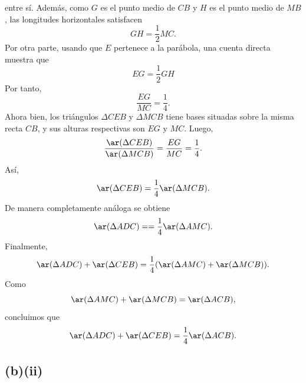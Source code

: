 \documentclass[12pt,a4paper]{article}
\begin{document}
\begin{solucion}
        entre sí. Además, como $G$ es el punto medio de $CB$ y $H$ es el punto medio de $MB$,
        las longitudes horizontales satisfacen
        \begin{equation*}
            GH=\frac{1}{2}MC.
        \end{equation*}
        Por otra parte, usando que $E$ pertenece a la parábola, una cuenta directa muestra que
        \begin{equation*}
            EG=\frac{1}{2}GH
        \end{equation*}
        Por tanto,
        \begin{equation*}
            \frac{EG}{MC}=\frac{1}{4}.
        \end{equation*}
        Ahora bien, los triángulos $\Delta CEB$ y $\Delta MCB$ tiene bases situadas sobre la misma
        recta $CB$, y sus alturas respectivas son $EG$ y $MC$. Luego,
        \begin{equation*}
            \frac{\ar(\Delta CEB)}{\ar(\Delta MCB)}=\frac{EG}{MC}=\frac{1}{4}.
        \end{equation*}
        Así,
        \begin{equation*}
            \ar(\Delta CEB)=\frac{1}{4}\ar(\Delta MCB).
        \end{equation*}
        De manera completamente análoga se obtiene
        \begin{equation*}
            \ar(\Delta ADC)==\frac{1}{4}\ar(\Delta AMC).
        \end{equation*}
        Finalmente,
        \begin{equation*}
            \ar(\Delta ADC)+\ar(\Delta CEB)=\frac{1}{4}(\ar(\Delta AMC)+\ar(\Delta MCB)).
        \end{equation*}
        Como
        \begin{equation*}
            \ar(\Delta AMC)+\ar(\Delta MCB)=\ar(\Delta ACB),
        \end{equation*}
        concluimos que
        \begin{equation*}
            \ar(\Delta ADC)+\ar(\Delta CEB)=\frac{1}{4}\ar(\Delta ACB).
        \end{equation*}

        \subsection*{(b)(ii)}


\end{solucion}
\end{document}
